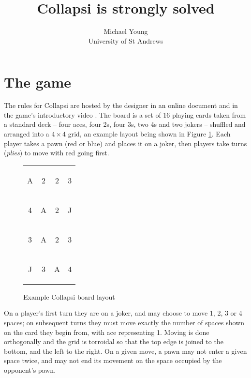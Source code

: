 \documentclass[a4paper, twocolumn]{article}
\title{Collapsi is strongly solved}
\author{Michael Young\\University of St Andrews}
\newcommand\card[1]{\begin{tcolorbox}#1\end{tcolorbox}}
\newcommand\board[8]{
  \setlength{\tabcolsep}{0.1cm}
  \begin{tabular}{c c c c}
    \card{#1} & \card{#2} & \card{#3} & \card{#4} \\
    \card{#5} & \card{#6} & \card{#7} & \card{#8} \\
    \boardmore
}
\newcommand\boardmore[8]{
    \card{#1} & \card{#2} & \card{#3} & \card{#4} \\
    \card{#5} & \card{#6} & \card{#7} & \card{#8}
  \end{tabular}
}
\begin{document}
\maketitle



\section{The game}

The rules for Collapsi are hosted by the designer in an online document
\cite{rules} and in the game's introductory video \cite{youtube}. The
board is a set of 16 playing cards taken from a standard deck -- four aces, four
2s, four 3s, two 4s and two jokers -- shuffled and arranged into a $4\times 4$
grid, an example layout being shown in Figure \ref{fig:board}. Each player takes
a pawn (red or blue) and places it on a joker, then players take turns
(\textit{plies}) to move with red going first.

\begin{figure}[ht]
  \centering
  \board A223 4A2J 3A23 J3A4
  \caption{Example Collapsi board layout}
  \label{fig:board}
\end{figure}

On a player's first turn they are on a joker, and may choose to move 1, 2, 3 or 4 spaces; on
subsequent turns they must move exactly the number of spaces shown on the card
they begin from, with ace representing 1. Moving is done orthogonally and the
grid is torroidal so that the top edge is joined to the bottom, and the left to
the right. On a given move, a pawn may not enter a given space twice, and may
not end its movement on the space occupied by the opponent's pawn.
\end{document}
